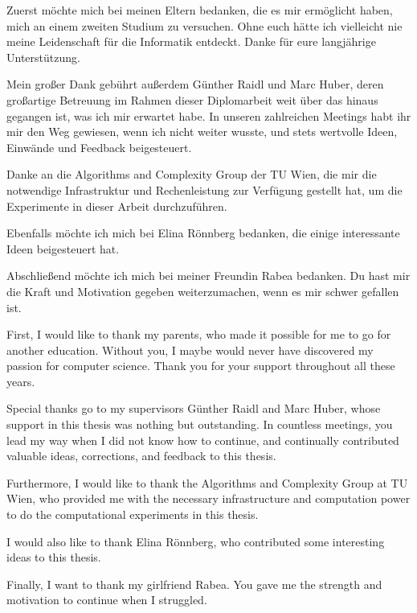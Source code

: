 \documentclass[draft,final]{vutinfth} %
\begin{document}
\frontmatter %

\addstatementpage

\begin{danksagung*}

Zuerst möchte mich bei meinen Eltern bedanken, die es mir ermöglicht haben, mich an einem zweiten Studium zu versuchen. 
Ohne euch hätte ich vielleicht nie meine Leidenschaft für die Informatik entdeckt. Danke für eure langjährige Unterstützung. 

Mein großer Dank gebührt außerdem Günther Raidl und Marc Huber, deren großartige Betreuung im Rahmen dieser Diplomarbeit weit über das hinaus gegangen ist, was ich mir erwartet habe. 
In unseren zahlreichen Meetings habt ihr mir den Weg gewiesen, wenn ich nicht weiter wusste, und stets wertvolle Ideen, Einwände und Feedback beigesteuert. 

Danke an die Algorithms and Complexity Group der TU Wien, die mir die notwendige Infrastruktur und Rechenleistung zur Verfügung gestellt hat, um die Experimente in dieser Arbeit durchzuführen. 

Ebenfalls möchte ich mich bei Elina Rönnberg bedanken, die einige interessante Ideen beigesteuert hat. 

Abschließend möchte ich mich bei meiner Freundin Rabea bedanken. 
Du hast mir die Kraft und Motivation gegeben weiterzumachen, wenn es mir schwer gefallen ist. 

\end{danksagung*}

\begin{acknowledgements*}
First, I would like to thank my parents, who made it possible for me to go for another education. Without you, I maybe would never have discovered my passion for computer science. Thank you for your support throughout all these years. 

Special thanks go to my supervisors Günther Raidl and Marc Huber, whose support in this thesis was nothing but outstanding. 
In countless meetings, you lead my way when I did not know how to continue, and continually contributed valuable ideas, corrections, and feedback to this thesis. 

Furthermore, I would like to thank the Algorithms and Complexity Group at TU Wien, who provided me with the necessary infrastructure and computation power to do the computational experiments in this thesis. 

I would also like to thank Elina Rönnberg, who contributed some interesting ideas to this thesis. 

Finally, I want to thank my girlfriend Rabea. You gave me the strength and motivation to continue when I struggled. 

\end{acknowledgements*}
\end{document}
